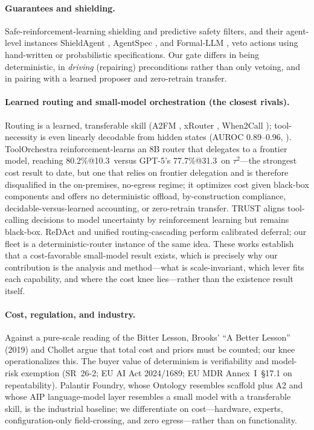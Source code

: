 \documentclass[10pt]{article}
\begin{document}
\paragraph{Guarantees and shielding.} Safe-reinforcement-learning shielding \citep{ax1807_06096} and predictive safety filters, and their agent-level instances ShieldAgent \citep{ax2503_22738}, AgentSpec \citep{ax2503_18666}, and Formal-LLM \citep{ax2402_00798}, veto actions using hand-written or probabilistic specifications. Our gate differs in being deterministic, in \emph{driving} (repairing) preconditions rather than only vetoing, and in pairing with a learned proposer and zero-retrain transfer.

\paragraph{Learned routing and small-model orchestration (the closest rivals).} Routing is a learned, transferable skill (A2FM \citep{ax2510_12838}, xRouter \citep{ax2510_08439}, When2Call \citep{ax2504_18851}); tool-necessity is even linearly decodable from hidden states (AUROC 0.89--0.96, \citealp{ax2605_09252}). ToolOrchestra \citep{ax2511_21689} reinforcement-learns an 8B router that delegates to a frontier model, reaching 80.2\%@10.3\textcent\ versus GPT-5's 77.7\%@31.3\textcent\ on $\tau^2$---the strongest cost result to date, but one that relies on frontier delegation and is therefore disqualified in the on-premises, no-egress regime; it optimizes cost given black-box components and offers no deterministic offload, by-construction compliance, decidable-versus-learned accounting, or zero-retrain transfer. TRUST \citep{ax2606_06976} aligns tool-calling decisions to model uncertainty by reinforcement learning but remains black-box. ReDAct \citep{ax2604_07036} and unified routing-cascading \citep{ax2410_10347} perform calibrated deferral; our fleet is a deterministic-router instance of the same idea. These works establish that a cost-favorable small-model result exists, which is precisely why our contribution is the analysis and method---what is scale-invariant, which lever fits each capability, and where the cost knee lies---rather than the existence result itself.

\paragraph{Cost, regulation, and industry.} Against a pure-scale reading of the Bitter Lesson, Brooks' ``A Better Lesson'' (2019) and Chollet \citep{ax1911_01547} argue that total cost and priors must be counted; our knee operationalizes this. The buyer value of determinism is verifiability and model-risk exemption (SR~26-2; EU AI Act 2024/1689; EU MDR Annex~I~\S17.1 on repeatability). Palantir Foundry, whose Ontology resembles scaffold plus A2 and whose AIP language-model layer resembles a small model with a transferable skill, is the industrial baseline; we differentiate on cost---hardware, experts, configuration-only field-crossing, and zero egress---rather than on functionality.
\end{document}
